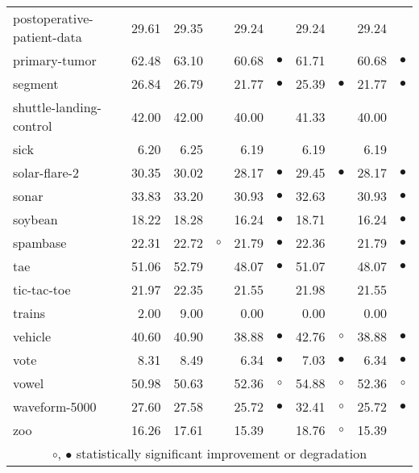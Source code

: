 {\begin{longtable}{lrr@{\hspace{0.1cm}}cr@{\hspace{0.1cm}}cr@{\hspace{0.1cm}}cr@{\hspace{0.1cm}}c}
postoperative-patient-data & 29.61 & 29.35 &           & 29.24 &           & 29.24 &           & 29.24 &          \\
primary-tumor & 62.48 & 63.10 &           & 60.68 & $\bullet$ & 61.71 &           & 60.68 & $\bullet$\\
segment & 26.84 & 26.79 &           & 21.77 & $\bullet$ & 25.39 & $\bullet$ & 21.77 & $\bullet$\\
shuttle-landing-control & 42.00 & 42.00 &           & 40.00 &           & 41.33 &           & 40.00 &          \\
sick &  6.20 &  6.25 &           &  6.19 &           &  6.19 &           &  6.19 &          \\
solar-flare-2 & 30.35 & 30.02 &           & 28.17 & $\bullet$ & 29.45 & $\bullet$ & 28.17 & $\bullet$\\
sonar & 33.83 & 33.20 &           & 30.93 & $\bullet$ & 32.63 &           & 30.93 & $\bullet$\\
soybean & 18.22 & 18.28 &           & 16.24 & $\bullet$ & 18.71 &           & 16.24 & $\bullet$\\
spambase & 22.31 & 22.72 &   $\circ$ & 21.79 & $\bullet$ & 22.36 &           & 21.79 & $\bullet$\\
tae & 51.06 & 52.79 &           & 48.07 & $\bullet$ & 51.07 &           & 48.07 & $\bullet$\\
tic-tac-toe & 21.97 & 22.35 &           & 21.55 &           & 21.98 &           & 21.55 &          \\
trains &  2.00 &  9.00 &           &  0.00 &           &  0.00 &           &  0.00 &          \\
vehicle & 40.60 & 40.90 &           & 38.88 & $\bullet$ & 42.76 &   $\circ$ & 38.88 & $\bullet$\\
vote &  8.31 &  8.49 &           &  6.34 & $\bullet$ &  7.03 & $\bullet$ &  6.34 & $\bullet$\\
vowel & 50.98 & 50.63 &           & 52.36 &   $\circ$ & 54.88 &   $\circ$ & 52.36 &   $\circ$\\
waveform-5000 & 27.60 & 27.58 &           & 25.72 & $\bullet$ & 32.41 &   $\circ$ & 25.72 & $\bullet$\\
zoo & 16.26 & 17.61 &           & 15.39 &           & 18.76 &   $\circ$ & 15.39 &          \\
\hline
\multicolumn{10}{c}{$\circ$, $\bullet$ statistically significant improvement or degradation}\\
\end{longtable} \footnotesize \par}